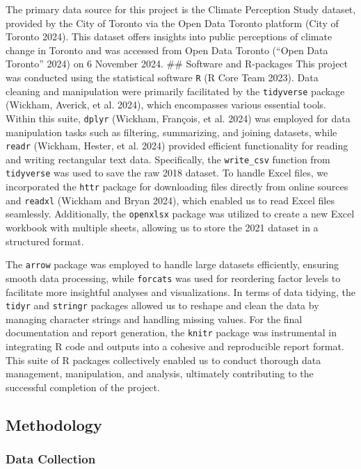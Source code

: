 \documentclass[
  letterpaper,
  DIV=11,
  numbers=noendperiod]{scrartcl}
\begin{document}
The primary data source for this project is the Climate Perception Study
dataset, provided by the City of Toronto via the Open Data Toronto
platform (City of Toronto 2024). This dataset offers insights into
public perceptions of climate change in Toronto and was accessed from
Open Data Toronto ({``Open Data Toronto''} 2024) on 6 November 2024.
\#\# Software and R-packages This project was conducted using the
statistical software \texttt{R} (R Core Team 2023). Data cleaning and
manipulation were primarily facilitated by the \texttt{tidyverse}
package (Wickham, Averick, et al. 2024), which encompasses various
essential tools. Within this suite, \texttt{dplyr} (Wickham, François,
et al. 2024) was employed for data manipulation tasks such as filtering,
summarizing, and joining datasets, while \texttt{readr} (Wickham,
Hester, et al. 2024) provided efficient functionality for reading and
writing rectangular text data. Specifically, the \texttt{write\_csv}
function from \texttt{tidyverse} was used to save the raw 2018 dataset.
To handle Excel files, we incorporated the \texttt{httr} package for
downloading files directly from online sources and \texttt{readxl}
(Wickham and Bryan 2024), which enabled us to read Excel files
seamlessly. Additionally, the \texttt{openxlsx} package was utilized to
create a new Excel workbook with multiple sheets, allowing us to store
the 2021 dataset in a structured format.

The \texttt{arrow} package was employed to handle large datasets
efficiently, ensuring smooth data processing, while \texttt{forcats} was
used for reordering factor levels to facilitate more insightful analyses
and visualizations. In terms of data tidying, the \texttt{tidyr} and
\texttt{stringr} packages allowed us to reshape and clean the data by
managing character strings and handling missing values. For the final
documentation and report generation, the \texttt{knitr} package was
instrumental in integrating R code and outputs into a cohesive and
reproducible report format. This suite of R packages collectively
enabled us to conduct thorough data management, manipulation, and
analysis, ultimately contributing to the successful completion of the
project.

\subsection{Methodology}\label{methodology}

\subsubsection{Data Collection}\label{data-collection}
\end{document}
